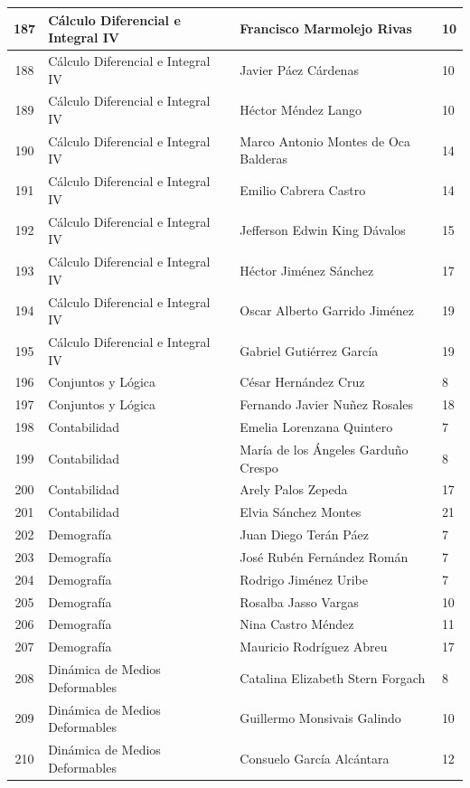 {\begin{longtable}{|c|p{6.5cm}|p{5cm}|p{1.5cm}|}
  187 & Cálculo Diferencial e Integral IV & Francisco Marmolejo Rivas & 10 \\ \hline
  188 & Cálculo Diferencial e Integral IV & Javier Páez Cárdenas & 10 \\ \hline
  189 & Cálculo Diferencial e Integral IV & Héctor Méndez Lango & 10 \\ \hline
  190 & Cálculo Diferencial e Integral IV & Marco Antonio Montes de Oca Balderas & 14 \\ \hline
  191 & Cálculo Diferencial e Integral IV & Emilio Cabrera Castro & 14 \\ \hline
  192 & Cálculo Diferencial e Integral IV & Jefferson Edwin King Dávalos & 15 \\ \hline
  193 & Cálculo Diferencial e Integral IV & Héctor Jiménez Sánchez & 17 \\ \hline
  194 & Cálculo Diferencial e Integral IV & Oscar Alberto Garrido Jiménez & 19 \\ \hline
  195 & Cálculo Diferencial e Integral IV & Gabriel Gutiérrez García & 19 \\ \hline
  196 & Conjuntos y Lógica & César Hernández Cruz & 8 \\ \hline
  197 & Conjuntos y Lógica & Fernando Javier Nuñez Rosales & 18 \\ \hline
  198 & Contabilidad & Emelia Lorenzana Quintero & 7 \\ \hline
  199 & Contabilidad & María de los Ángeles Garduño Crespo & 8 \\ \hline
  200 & Contabilidad & Arely Palos Zepeda & 17 \\ \hline
  201 & Contabilidad & Elvia Sánchez Montes & 21 \\ \hline
  202 & Demografía & Juan Diego Terán Páez & 7 \\ \hline
  203 & Demografía & José Rubén Fernández Román & 7 \\ \hline
  204 & Demografía & Rodrigo Jiménez Uribe & 7 \\ \hline
  205 & Demografía & Rosalba Jasso Vargas & 10 \\ \hline
  206 & Demografía & Nina Castro Méndez & 11 \\ \hline
  207 & Demografía & Mauricio Rodríguez Abreu & 17 \\ \hline
  208 & Dinámica de Medios Deformables & Catalina Elizabeth Stern Forgach & 8 \\ \hline
  209 & Dinámica de Medios Deformables & Guillermo Monsivais Galindo & 10 \\ \hline
  210 & Dinámica de Medios Deformables & Consuelo García Alcántara & 12 \\ \hline

\end{longtable}}
